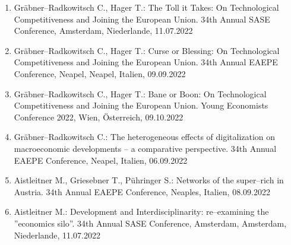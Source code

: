 \begin{enumerate}
	\item Gräbner--Radkowitsch C., Hager T.: The Toll it Takes: On Technological Competitiveness and Joining the European Union. 34th Annual SASE Conference, Amsterdam, Niederlande, 11.07.2022
	\item Gräbner--Radkowitsch C., Hager T.: Curse or Blessing: On Technological Competitiveness and Joining the European Union. 34th Annual EAEPE Conference, Neapel, Neapel, Italien, 09.09.2022
	\item Gräbner--Radkowitsch C., Hager T.: Bane or Boon: On Technological Competitiveness and Joining the European Union. Young Economists Conference 2022, Wien, Österreich, 09.10.2022
	\item Gräbner--Radkowitsch C.: The heterogeneous effects of digitalization on macroeconomic developments -- a comparative perspective. 34th Annual EAEPE Conference, Neapel, Italien, 06.09.2022
	\item Aistleitner M., Griesebner T., Pühringer S.: Networks of the super--rich in Austria. 34th Annual EAEPE Conference, Neaples, Italien, 08.09.2022
	\item Aistleitner M.: Development and Interdisciplinarity: re--examining the ''economics silo''. 34th Annual SASE Conference, Amsterdam, Amsterdam, Niederlande, 11.07.2022
\end{enumerate}
